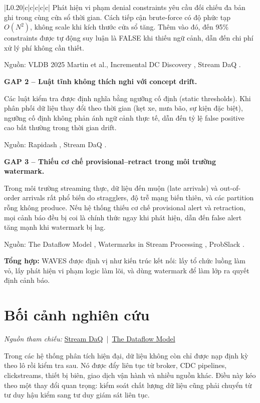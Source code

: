{\begin{longtable}{|L{0.20\textwidth}|c|c|c|c|c|}
Phát hiện vi phạm denial constraints yêu cầu đối chiếu đa bản ghi trong cùng cửa sổ thời gian. Cách tiếp cận brute-force có độ phức tạp $O(N^2)$, không scale khi kích thước cửa sổ tăng. Thêm vào đó, đến 95\% constraints được tự động suy luận là FALSE khi thiếu ngữ cảnh, dẫn đến chi phí xử lý phí không cần thiết.

Nguồn: VLDB 2025 Martin et al., Incremental DC Discovery \cite{springer2024incremental}, Stream DaQ \cite{arxiv2506streamdaq}.

\textbf{GAP 2 -- Luật tĩnh không thích nghi với concept drift.}

Các luật kiểm tra được định nghĩa bằng ngưỡng cố định (static thresholds). Khi phân phối dữ liệu thay đổi theo thời gian (kẹt xe, mưa bão, sự kiện đặc biệt), ngưỡng cố định không phản ánh ngữ cảnh thực tế, dẫn đến tỷ lệ false positive cao bất thường trong thời gian drift.

Nguồn: Rapidash \cite{vldb2024rapidash}, Stream DaQ \cite{arxiv2506streamdaq}.

\textbf{GAP 3 -- Thiếu cơ chế provisional--retract trong môi trường watermark.}

Trong môi trường streaming thực, dữ liệu đến muộn (late arrivals) và out-of-order arrivals rất phổ biến do stragglers, độ trễ mạng biến thiên, và các partition rỗng không produce. Nếu hệ thống thiếu cơ chế provisional alert và retraction, mọi cảnh báo đều bị coi là chính thức ngay khi phát hiện, dẫn đến false alert tăng mạnh khi watermark bị lag.

Nguồn: The Dataflow Model \cite{vldb2015dataflow}, Watermarks in Stream Processing \cite{vldb2017watermarks}, ProbSlack \cite{pods2018probslack}.

\textbf{Tổng hợp:} WAVES được định vị như kiến trúc kết nối: lấy tổ chức luồng làm vỏ, lấy phát hiện vi phạm logic làm lõi, và dùng watermark để làm lớp ra quyết định cảnh báo.

\section{Bối cảnh nghiên cứu}

\noindent \textit{Nguồn tham chiếu: }
\href{https://arxiv.org/abs/2506.06147}{Stream DaQ} \,|\, \href{https://research.google.com/pubs/archive/43864.pdf}{The Dataflow Model}

Trong các hệ thống phân tích hiện đại, dữ liệu không còn chỉ được nạp định kỳ theo lô rồi kiểm tra sau. Nó được đẩy liên tục từ broker, CDC pipelines, clickstreams, thiết bị biên, giao dịch vận hành và nhiều nguồn khác. Điều này kéo theo một thay đổi quan trọng: kiểm soát chất lượng dữ liệu cũng phải chuyển từ tư duy hậu kiểm sang tư duy giám sát liên tục.


\end{longtable}}
